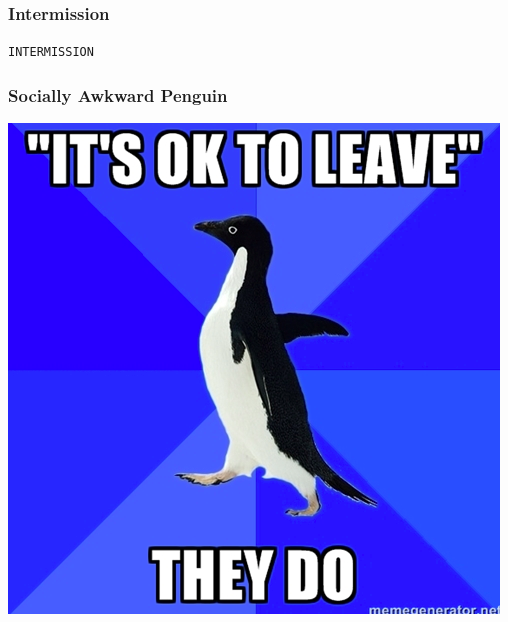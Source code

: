 \documentclass[slidestop,compress,mathserif]{beamer}
\begin{document}
\begin{frame}
	\frametitle{Intermission}
	\begin{center}
		\texttt{INTERMISSION}
	\end{center}
\end{frame}

\begin{frame}
	\frametitle{Socially Awkward Penguin}
	\begin{center}
		\includegraphics[scale=0.3]{img/sap.png}
	\end{center}
\end{frame}
\end{document}
